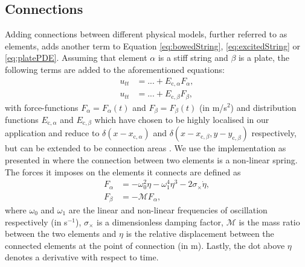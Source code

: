 \documentclass{article}
\begin{document}
\subsection{Connections}\label{sec:connections}
Adding connections between different physical models, further referred to as elements, adds another term to Equation \eqref{eq:bowedString}, \eqref{eq:excitedString} or \eqref{eq:platePDE}. Assuming that element $\alpha$ is a stiff string and $\beta$ is a plate, the following terms are added to the aforementioned equations:
\begin{subequations}
\begin{align}
    \label{eq:stringConnection}
    u_{tt} &= ... + E_{\text{c},\alpha}F_\alpha, \\
    \label{eq:plateConnection}
    u_{tt} &= ... + E_{\text{c},\beta}F_\beta,
\end{align}
\end{subequations}
with force-functions $F_\alpha = F_\alpha(t)$ and $F_\beta = F_\beta(t)$ (in m/s$^2$) and distribution functions $E_{\text{c},\alpha}$ and $E_{\text{c},\beta}$ which have chosen to be highly localised in our application and reduce to $\delta(x-x_{\text{c},\alpha})$ and $\delta(x-x_{\text{c},\beta}, y-y_{\text{c},\beta})$ respectively, but can be extended to be connection areas \cite{Bilbao2009:ModularPercussion}. We use the implementation as presented in \cite{Bilbao2009:ModularPercussion} where the connection between two elements is a non-linear spring. The forces it imposes on the elements it connects are defined as
\begin{subequations}\label{eq:connectionsPDE}
\begin{align}
    F_\alpha &= -\omega_0^2\eta - \omega_1^4\eta^3 - 2\sigma_\times\dot\eta,\\
    \label{eq:FBeta} F_\beta &= -\mathcal{M}F_\alpha,
\end{align}
\end{subequations}
where $\omega_0$ and $\omega_1$ are the linear and non-linear frequencies of oscillation respectively (in s$^{-1}$), $\sigma_\times$ is a dimensionless damping factor, $\mathcal{M}$ is the mass ratio between the two elements and $\eta$ is the relative displacement between the connected elements at the point of connection (in m). Lastly, the dot above $\eta$ denotes a derivative with respect to time.
\end{document}
